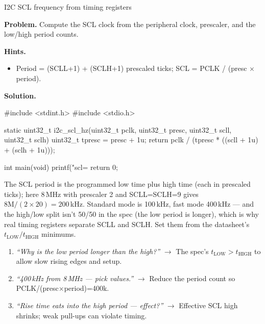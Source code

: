 \begin{gymproblem}{I2C SCL frequency from timing registers}

\textbf{Problem.} Compute the SCL clock from the peripheral clock, prescaler,
and the low/high period counts.

\textbf{Hints.}
\begin{itemize}
\item Period = (SCLL+1) + (SCLH+1) prescaled ticks; SCL = PCLK / (presc $\times$
  period).
\end{itemize}

\attempt

\textbf{Solution.}
\begin{cgym}
#include <stdint.h>
#include <stdio.h>

static uint32_t i2c_scl_hz(uint32_t pclk, uint32_t presc, uint32_t scll, uint32_t sclh) {
    uint32_t tpresc = presc + 1u;
    return pclk / (tpresc * ((scll + 1u) + (sclh + 1u)));
}

int main(void) {
    printf("scl=%
    return 0;
}
\end{cgym}

The SCL period is the programmed low time plus high time (each in prescaled
ticks); here 8\,MHz with prescaler 2 and SCLL=SCLH=9 gives
$8\text{M}/(2\times20) = 200$\,kHz. Standard mode is 100\,kHz, fast mode
400\,kHz --- and the high/low split isn't 50/50 in the spec (the low period is
longer), which is why real timing registers separate SCLL and SCLH. Set them
from the datasheet's $t_{\text{LOW}}/t_{\text{HIGH}}$ minimums.

\followups
\begin{enumerate}
\item \emph{``Why is the low period longer than the high?''} $\rightarrow$ The
  spec's $t_{\text{LOW}} > t_{\text{HIGH}}$ to allow slow rising edges and
  setup.
\item \emph{``400\,kHz from 8\,MHz --- pick values.''} $\rightarrow$ Reduce the
  period count so PCLK/(presc$\times$period)=400k.
\item \emph{``Rise time eats into the high period --- effect?''} $\rightarrow$
  Effective SCL high shrinks; weak pull-ups can violate timing.
\end{enumerate}
\end{gymproblem}

